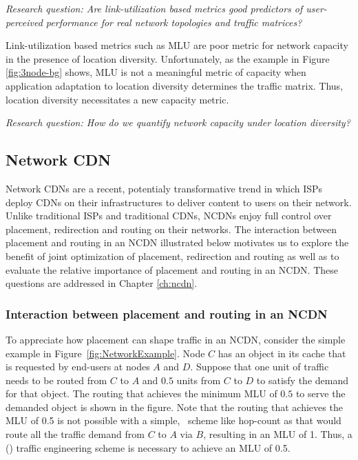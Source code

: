 \emph{Research question: Are link-utilization based metrics good predictors of user-perceived performance for real network topologies and traffic matrices?}

Link-utilization based metrics such as MLU are poor metric for network capacity in the presence of location diversity. Unfortunately, as the example in Figure \ref{fig:3node-bg} shows, MLU is not a meaningful metric of capacity when application adaptation to location diversity determines the traffic matrix. 
Thus, location diversity necessitates a new capacity metric.


\emph{Research question: How do we quantify network capacity under location diversity?}

\subsection{Network CDN}
\label{sec:bg-ncdn}
Network CDNs are a recent, potentialy transformative trend in which ISPs deploy CDNs on their infrastructures to deliver content to users on their network.  Unlike traditional ISPs and traditional CDNs, NCDNs enjoy full control over placement, redirection and routing on their networks. The interaction between placement and routing in an NCDN illustrated below motivates us to explore the benefit of joint optimization of placement, redirection and routing as well as to evaluate the relative importance of placement and routing in an NCDN. These questions are addressed in Chapter \ref{ch:ncdn}.

\subsubsection{Interaction between placement and routing in an NCDN}
\label{sec:bg-ncdn-interaction}

To appreciate how placement can shape traffic in an NCDN, consider the simple example in Figure~\ref{fig:NetworkExample}. Node $C$ has an object in its cache that is requested by end-users at nodes $A$ and $D$. Suppose that one unit of traffic needs to be routed from $C$ to $A$ and $0.5$ units  from $C$ to $D$ to satisfy the demand for that object. The routing that achieves the minimum MLU of $0.5$ to serve the demanded object is shown in the figure. Note that the routing that achieves the MLU of 0.5 is not possible with a simple, \unplanned\ scheme like hop-count as that would route all the traffic demand from $C$ to $A$ via $B$, resulting in an MLU of 1. Thus, a (\planned) traffic engineering scheme is necessary to achieve an MLU of 0.5.

